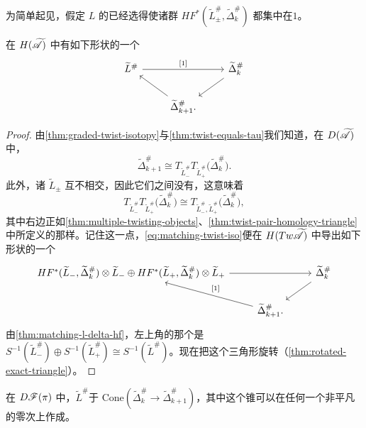 为简单起见，假定 $L$ 的\trGrading{}已经选得使诸群 $HF^{*}(\widetilde{L}^{\#}_{\pm},\widetilde{\Delta}^{\#}_k)$ 都集中在\trDegree{}$1$。
\begin{lemma}\label{thm:matching-exact-triangle}
在 $H(\widetilde{\mathscr{A}})$ 中有如下形状的一个\trExactTriangle
\begin{equation}\label{eq:matching-exact-triangle-diagram}
\begin{tikzcd}
\widetilde{L}^{\#} \ar[rr,"{[1]}"] && \widetilde{\Delta}^{\#}_k \ar[dl] \\
& \widetilde{\Delta}^{\#}_{k+1}. \ar[ul] &
\end{tikzcd}
\end{equation}
\end{lemma}
\begin{proof}
由\cref{thm:graded-twist-isotopy}与\cref{thm:twist-equals-tau}我们知道，在 $D(\widetilde{\mathscr{A}})$ 中，
\begin{equation}\label{eq:matching-twist-iso}
\widetilde{\Delta}^{\#}_{k+1}\cong T_{\widetilde{L}^{\#}_{-}}T_{\widetilde{L}^{\#}_{+}}\bigl(\widetilde{\Delta}^{\#}_{k}\bigr).
\end{equation}
此外，诸 $\widetilde{L}_{\pm}$ 互不相交，因此它们之间没有\trMorphism，这意味着
\begin{equation*}
T_{\widetilde{L}^{\#}_{-}}T_{\widetilde{L}^{\#}_{+}}\bigl(\widetilde{\Delta}^{\#}_{k}\bigr)
\cong T_{\widetilde{L}^{\#}_{-},\widetilde{L}^{\#}_{+}}\bigl(\widetilde{\Delta}^{\#}_{k}\bigr),
\end{equation*}
其中右边正如\cref{thm:multiple-twisting-objects}、\cref{thm:twist-pair-homology-triangle}中所定义的那样。记住这一点，\eqref{eq:matching-twist-iso}便在 $H(Tw\widetilde{\mathscr{A}})$ 中导出如下形状的一个\trExactTriangle
\begin{equation*}
\begin{tikzcd}
HF^{*}(\widetilde{L}_{-},\widetilde{\Delta}^{\#}_k)\otimes\widetilde{L}_{-}\oplus
HF^{*}(\widetilde{L}_{+},\widetilde{\Delta}^{\#}_k)\otimes\widetilde{L}_{+}
\ar[rr] && \widetilde{\Delta}^{\#}_k \ar[dl] \\
& \widetilde{\Delta}^{\#}_{k+1}. \ar[ul,"{[1]}"'] &
\end{tikzcd}
\end{equation*}
由\cref{thm:matching-l-delta-hf}，左上角的那个\trVertex{}是 $S^{-1}(\widetilde{L}^{\#}_{-})\oplus S^{-1}(\widetilde{L}^{\#}_{+})\cong S^{-1}(\widetilde{L}^{\#})$。现在把这个三角形旋转（\cref{thm:rotated-exact-triangle}）。
\end{proof}
\begin{proposition}\label{thm:matching-l-cone}
在 $D\mathscr{F}(\pi)$ 中，$\widetilde{L}^{\#}$\trIsomorphic{}于 $\mathrm{Cone}(\widetilde{\Delta}^{\#}_k\to\widetilde{\Delta}^{\#}_{k+1})$，其中这个锥可以在任何一个非平凡的零次\trMorphism{}上作成。
\end{proposition}
